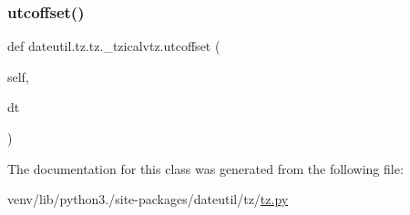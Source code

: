 \mbox{\label{classdateutil_1_1tz_1_1tz_1_1__tzicalvtz_ac07c45cd35134945172c0653ce5948e8}} 
\subsubsection{\texorpdfstring{utcoffset()}{utcoffset()}}
{\footnotesize\ttfamily def dateutil.\+tz.\+tz.\+\_\+tzicalvtz.\+utcoffset (\begin{DoxyParamCaption}\item[{}]{self,  }\item[{}]{dt }\end{DoxyParamCaption})}



The documentation for this class was generated from the following file\+:\begin{DoxyCompactItemize}
\item 
venv/lib/python3./site-\/packages/dateutil/tz/\hyperlink{tz_8py}{tz.\+py}\end{DoxyCompactItemize}
